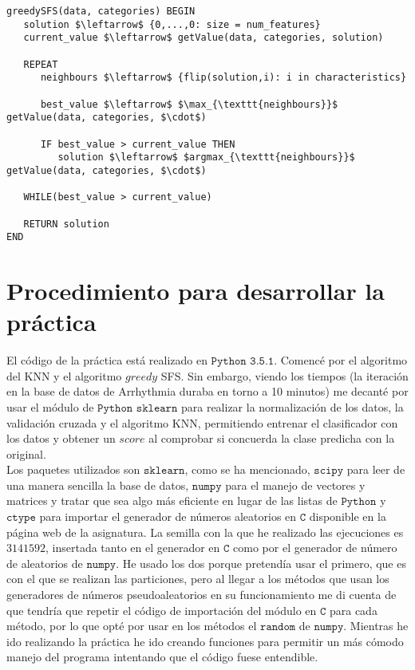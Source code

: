 \documentclass[11pt,leqno]{article}
\begin{document}
	\begin{lstlisting}[mathescape=true]
greedySFS(data, categories) BEGIN
   solution $\leftarrow$ {0,...,0: size = num_features}
   current_value $\leftarrow$ getValue(data, categories, solution)
   
   REPEAT
      neighbours $\leftarrow$ {flip(solution,i): i in characteristics}
   
      best_value $\leftarrow$ $\max_{\texttt{neighbours}}$ getValue(data, categories, $\cdot$)
      
      IF best_value > current_value THEN
         solution $\leftarrow$ $argmax_{\texttt{neighbours}}$ getValue(data, categories, $\cdot$)
   
   WHILE(best_value > current_value)
   
   RETURN solution
END
	\end{lstlisting}


\section{Procedimiento para desarrollar la práctica}

El código de la práctica está realizado en $\texttt{Python 3.5.1}$. Comencé por el algoritmo del KNN y el algoritmo $\textit{greedy}$ SFS. Sin embargo, viendo los tiempos (la iteración en la base de datos de Arrhythmia duraba en torno a 10 minutos) me decanté por usar el módulo de $\texttt{Python}$ $\texttt{sklearn}$ para realizar la normalización de los datos, la validación cruzada y el algoritmo KNN, permitiendo entrenar el clasificador con los datos y obtener un $\textit{score}$ al comprobar si concuerda la clase predicha con la original.\\

Los paquetes utilizados son $\texttt{sklearn}$, como se ha mencionado, $\texttt{scipy}$ para leer de una manera sencilla la base de datos, $\texttt{numpy}$ para el manejo de vectores y matrices y tratar que sea algo más eficiente en lugar de las listas de $\texttt{Python}$ y $\texttt{ctype}$ para importar el generador de números aleatorios en $\texttt{C}$ disponible en la página web de la asignatura. La semilla con la que he realizado las ejecuciones es $3141592$, insertada tanto en el generador en $\texttt{C}$ como por el generador de número de aleatorios de $\texttt{numpy}$. He usado los dos porque pretendía usar el primero, que es con el que se realizan las particiones, pero al llegar a los métodos que usan los generadores de números pseudoaleatorios en su funcionamiento me di cuenta de que tendría que repetir el código de importación del módulo en $\texttt{C}$ para cada método, por lo que opté por usar en los métodos el $\texttt{random}$ de $\texttt{numpy}$. Mientras he ido realizando la práctica he ido creando funciones para permitir un más cómodo manejo del programa intentando que el código fuese entendible.
\end{document}
